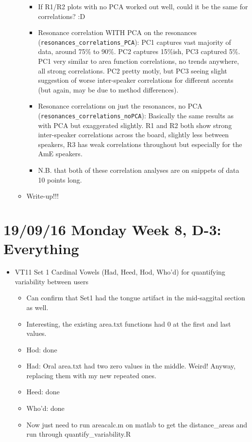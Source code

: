 \documentclass{article}
\begin{document}
\begin{itemize}
\begin{itemize}
        \begin{itemize}
            \item If R1/R2 plots with no PCA worked out well, could it be the same for correlations? :D
            \item Resonance correlation WITH PCA on the resonances (\verb|resonances_correlations_PCA|): PC1 captures vast majority of data, around 75\% to 90\%. PC2 captures 15\%ish, PC3 captured 5\%. PC1 very similar to area function correlations, no trends anywhere, all strong correlations. PC2 pretty motly, but PC3 seeing slight suggestion of worse inter-speaker correlations for different accents (but again, may be due to method differences).
            \item Resonance correlations on just the resonances, no PCA (\verb|resonances_correlations_noPCA|): Basically the same results as with PCA but exaggerated slightly. R1 and R2 both show strong inter-speaker correlations across the board, slightly less between speakers, R3 has weak correlations throughout but especially for the AmE speakers.
            \item N.B. that both of these correlation analyses are on snippets of data 10 points long.
        \end{itemize}
        \item Write-up!!!
    \end{itemize}
\end{itemize}

\section*{19/09/16 Monday Week 8, D-3: Everything}
\begin{itemize}
    \item VT11 Set 1 Cardinal Vowels (Had, Heed, Hod, Who'd) for quantifying variability between users
    \begin{itemize}
        \item Can confirm that Set1 had the tongue artifact in the mid-saggital section as well.
        \item Interesting, the existing area.txt functions had 0 at the first and last values.
        \item Hod: done
        \item Had: Oral area.txt had two zero values in the middle. Weird! Anyway, replacing them with my new repeated ones.
        \item Heed: done
        \item Who'd: done
        \item Now just need to run areacalc.m on matlab to get the distance\_areas and run through quantify\_variability.R
    \end{itemize}   
\end{itemize}
\end{document}
